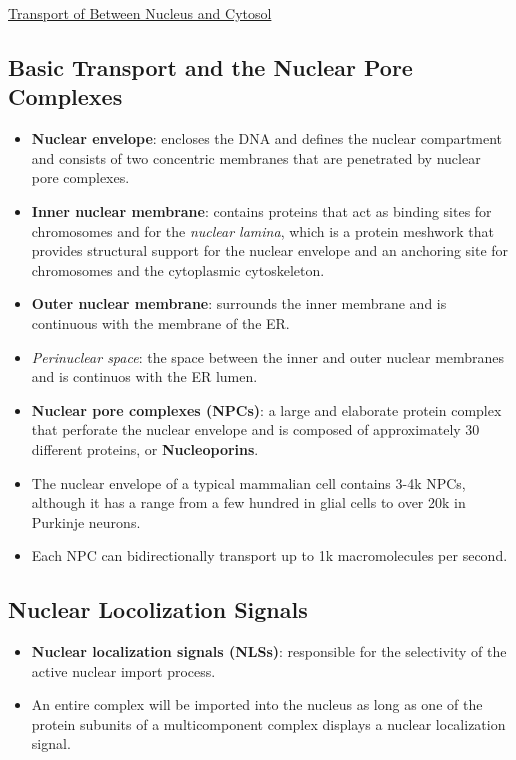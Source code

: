 \documentclass[12pt,letterpaper]{article}
\begin{document}
\hypertarget{12.2}{}
\begin{secbox}{\hyperlink{12}{Transport of Between Nucleus and Cytosol}}{
    \hypertarget{12.2.1}{\subsection*{Basic Transport and the Nuclear Pore Complexes}}
    \begin{itemize}
        \item \textbf{Nuclear envelope}: encloses the DNA and defines the nuclear compartment and consists of two concentric membranes that are penetrated by nuclear pore complexes.
        \item \textbf{Inner nuclear membrane}: contains proteins that act as binding sites for chromosomes and for the \textit{nuclear lamina}, which is a protein meshwork that provides structural support for the nuclear envelope and an anchoring  site for chromosomes and the cytoplasmic cytoskeleton.
        \item \textbf{Outer nuclear membrane}: surrounds the inner membrane and is continuous with the membrane of the ER.
        \item \textit{Perinuclear space}: the space between the inner and outer nuclear membranes and is continuos with the ER lumen.
        \item \textbf{Nuclear pore complexes (NPCs)}: a large and elaborate protein complex that perforate the nuclear envelope and is composed of approximately 30 different proteins, or \textbf{Nucleoporins}.
        \item The nuclear envelope of a typical mammalian cell contains 3-4k NPCs, although it has a range from a few hundred in glial cells to over 20k in Purkinje neurons. 
        \item Each NPC can bidirectionally transport up to 1k macromolecules per second.
    \end{itemize}

    \hypertarget{12.2.2}{\subsection*{Nuclear Locolization Signals}}
    \begin{itemize}
        \item \textbf{Nuclear localization signals (NLSs)}: responsible for the selectivity of the active nuclear import process.
        \item An entire complex will be imported into the nucleus as long as one of the protein subunits of a multicomponent complex displays a nuclear localization signal.
    \end{itemize}

}
\end{secbox}
\end{document}
